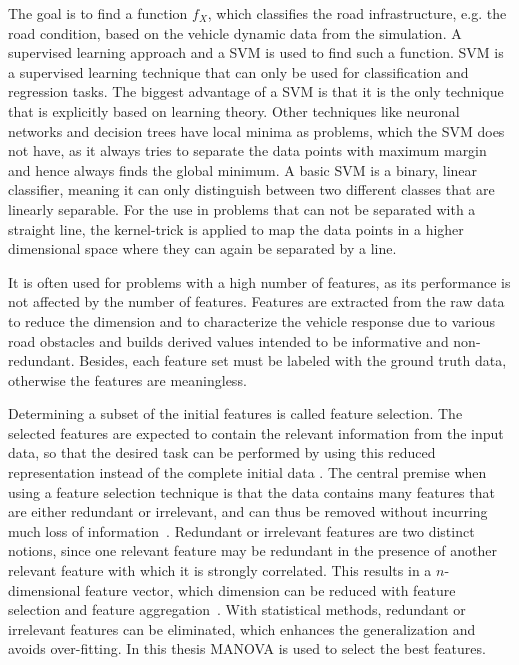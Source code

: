 The goal is to find a function $f_X$, which classifies the road infrastructure, e.g. the road condition, based on the vehicle dynamic data from the simulation.
%
A supervised learning approach and a \ac{SVM} is used to find such a function.
%
\ac{SVM} is a supervised learning technique that can only be used for classification and regression
tasks.
%
The biggest advantage of a \ac{SVM} is that it is the only technique that is explicitly based on
learning theory.
%
Other techniques like neuronal networks and decision trees have local minima as problems, which the SVM does not have, as it always tries to separate the data points with maximum margin and hence always finds the global minimum.
%
A basic \ac{SVM} is a binary, linear classifier, meaning it can only distinguish between two different classes that are linearly separable.
%
For the use in problems that can not be separated with a straight line, the kernel-trick is applied to map the data points in a higher dimensional space where they can again be separated by a line.

It is often used for problems with a high number of features, as its performance is not affected by the number of features.
%
Features are extracted from the raw data to reduce the dimension and to characterize the vehicle response due to various road obstacles and builds derived values intended to be informative and non-redundant.
%
Besides, each feature set must be labeled with the ground truth data, otherwise the features are meaningless.

Determining a subset of the initial features is called feature selection.
%
The selected features are expected to contain the relevant information from the input data, so that the desired task can be performed by using this reduced representation instead of the complete initial data \cite{alpaydin2014introduction}.
%
The central premise when using a feature selection technique is that the data contains many features that are either redundant or irrelevant, and can thus be removed without incurring much loss of information~\cite{bermingham2015application}.
%
Redundant or irrelevant features are two distinct notions, since one relevant feature may be redundant in the presence of another relevant feature with which it is strongly correlated.
This results in a $n$-dimensional feature vector, which dimension can be reduced with feature selection and feature aggregation~\cite{guyon2003introduction}.
%
With statistical methods, redundant or irrelevant features can be eliminated, which enhances the generalization and avoids over-fitting.
%
In this thesis \ac{MANOVA} is used to select the best features.

